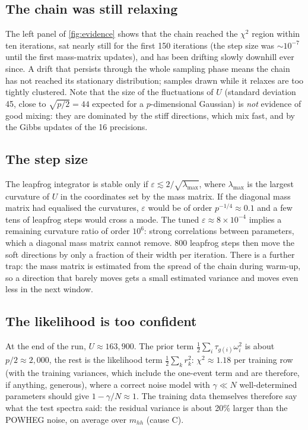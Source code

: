 \subsection{The chain was still relaxing}

The left panel of \cref{fig:evidence} shows that the chain reached the $\chi^2$ region
within ten iterations, sat nearly still for the first 150 iterations (the step size was
$\sim\!10^{-7}$ until the first mass-matrix updates), and has been drifting slowly
downhill ever since. A drift that persists through the whole sampling phase means the chain
has not reached its stationary distribution; samples drawn while it relaxes are too tightly
clustered. Note that the size of the fluctuations of $U$ (standard deviation 45, close to
$\sqrt{p/2} = 44$ expected for a $p$-dimensional Gaussian) is \emph{not} evidence of
good mixing: they are dominated by the stiff directions, which mix fast, and by the Gibbs
updates of the 16 precisions.

\subsection{The step size}

The leapfrog integrator \cite{Neal:2011} is stable only if $\varepsilon \lesssim 2/\sqrt{\lambda_\text{max}}$,
where $\lambda_\text{max}$ is the largest curvature of $U$ in the coordinates set by the
mass matrix. If the diagonal mass matrix had equalised the curvatures, $\varepsilon$ would
be of order $p^{-1/4} \approx 0.1$ and a few tens of leapfrog steps would cross a mode. The
tuned $\varepsilon \approx 8\times10^{-4}$ implies a remaining curvature ratio of order
$10^6$: strong correlations between parameters, which a diagonal mass matrix cannot remove.
800 leapfrog steps then move the soft directions by only a fraction of their width per
iteration. There is a further trap: the mass matrix is estimated from the spread of the
chain during warm-up, so a direction that barely moves gets a small estimated variance and
moves even less in the next window.

\subsection{The likelihood is too confident}

At the end of the run, $U \approx 163{,}900$. The prior term
$\tfrac12\sum_i\tau_{g(i)}\omega_i^2$ is about $p/2 \approx 2{,}000$, the rest is the
likelihood term $\tfrac12\sum_k r_k^2$: $\chi^2 \approx 1.18$ per training row (with the
training variances, which include the one-event term and are therefore, if anything,
generous), where a correct
noise model with $\gamma \ll N$ well-determined parameters should give $1 - \gamma/N
\approx 1$. The training data themselves therefore say what the test spectra said: the
residual variance is about 20\% larger than the POWHEG noise, on average over $m_{hh}$
(cause C).


